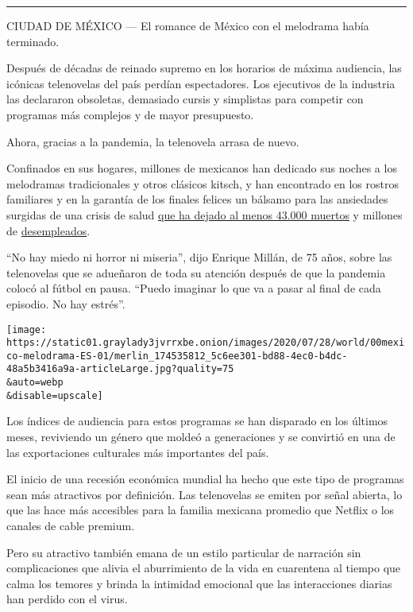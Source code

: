 \begin{center}\rule{0.5\linewidth}{\linethickness}\end{center}

CIUDAD DE MÉXICO --- El romance de México con el melodrama había
terminado.

Después de décadas de reinado supremo en los horarios de máxima
audiencia, las icónicas telenovelas del país perdían espectadores. Los
ejecutivos de la industria las declararon obsoletas, demasiado cursis y
simplistas para competir con programas más complejos y de mayor
presupuesto.

Ahora, gracias a la pandemia, la telenovela arrasa de nuevo.

Confinados en sus hogares, millones de mexicanos han dedicado sus noches
a los melodramas tradicionales y otros clásicos kitsch, y han encontrado
en los rostros familiares y en la garantía de los finales felices un
bálsamo para las ansiedades surgidas de una crisis de salud
\href{https://www.nytimes3xbfgragh.onion/es/interactive/2020/espanol/america-latina/coronavirus-en-mexico.html}{que
ha dejado al menos 43.000 muertos} y millones de
\href{https://www.nytimes3xbfgragh.onion/es/2020/06/08/espanol/america-latina/mexico-amlo-deuda-coronavirus.html}{desempleados}.

``No hay miedo ni horror ni miseria'', dijo Enrique Millán, de 75 años,
sobre las telenovelas que se adueñaron de toda su atención después de
que la pandemia colocó al fútbol en pausa. ``Puedo imaginar lo que va a
pasar al final de cada episodio. No hay estrés''.

\texttt{[image: https://static01.graylady3jvrrxbe.onion/images/2020/07/28/world/00mexico-melodrama-ES-01/merlin\_174535812\_5c6ee301-bd88-4ec0-b4dc-48a5b3416a9a-articleLarge.jpg?quality=75\\\&auto=webp\\\&disable=upscale]}

Los índices de audiencia para estos programas se han disparado en los
últimos meses, reviviendo un género que moldeó a generaciones y se
convirtió en una de las exportaciones culturales más importantes del
país.

El inicio de una recesión económica mundial ha hecho que este tipo de
programas sean más atractivos por definición. Las telenovelas se emiten
por señal abierta, lo que las hace más accesibles para la familia
mexicana promedio que Netflix o los canales de cable premium.

Pero su atractivo también emana de un estilo particular de narración sin
complicaciones que alivia el aburrimiento de la vida en cuarentena al
tiempo que calma los temores y brinda la intimidad emocional que las
interacciones diarias han perdido con el virus.

